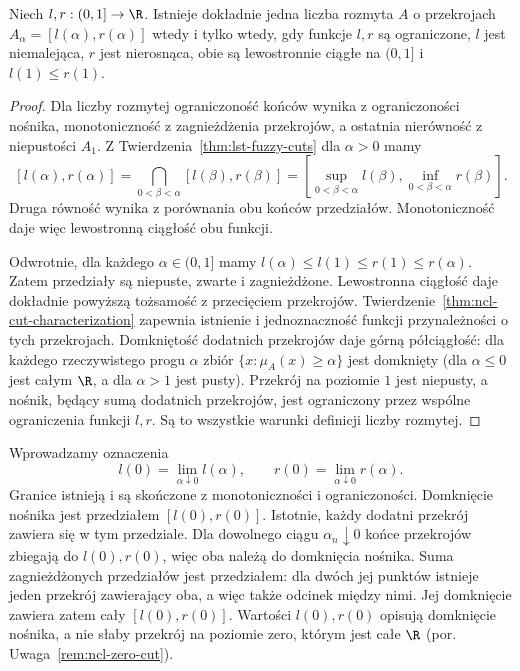 \begin{twierdzenie}
\label{thm:ncl-fuzzy-endpoints}
Niech $l,r:(0,1]\to\R$. Istnieje dokładnie jedna
liczba rozmyta $A$ o przekrojach
$A_\alpha=[l(\alpha),r(\alpha)]$ wtedy i tylko wtedy,
gdy funkcje $l,r$ są ograniczone, $l$ jest niemalejąca,
$r$ jest nierosnąca, obie są lewostronnie ciągłe
na $(0,1]$ i $l(1)\leq r(1)$.
\end{twierdzenie}
\begin{proof}
Dla liczby rozmytej ograniczoność końców wynika
z ograniczoności nośnika, monotoniczność z zagnieżdżenia
przekrojów, a ostatnia nierówność z niepustości $A_1$.
Z Twierdzenia~\ref{thm:lst-fuzzy-cuts} dla $\alpha>0$
mamy
\[
 [l(\alpha),r(\alpha)]
 =\bigcap_{0<\beta<\alpha}[l(\beta),r(\beta)]
 =\left[\sup_{0<\beta<\alpha}l(\beta),
         \inf_{0<\beta<\alpha}r(\beta)\right].
\]
Druga równość wynika z porównania obu końców
przedziałów. Monotoniczność daje więc lewostronną
ciągłość obu funkcji.

Odwrotnie, dla każdego $\alpha\in(0,1]$ mamy
$l(\alpha)\leq l(1)\leq r(1)\leq r(\alpha)$.
Zatem przedziały są niepuste, zwarte i zagnieżdżone.
Lewostronna ciągłość daje dokładnie powyższą
tożsamość z przecięciem przekrojów.
Twierdzenie~\ref{thm:ncl-cut-characterization}
zapewnia istnienie i jednoznaczność funkcji
przynależności o tych przekrojach.
Domkniętość dodatnich przekrojów daje górną
półciągłość: dla każdego rzeczywistego progu
$\alpha$ zbiór $\{x:\mu_A(x)\geq\alpha\}$ jest
domknięty (dla $\alpha\leq0$ jest całym $\R$,
a dla $\alpha>1$ jest pusty).
Przekrój na poziomie $1$ jest niepusty,
a nośnik, będący sumą dodatnich przekrojów,
jest ograniczony przez wspólne ograniczenia
funkcji $l,r$. Są to wszystkie warunki definicji
liczby rozmytej.
\end{proof}
Wprowadzamy oznaczenia
\[
 l(0)=\lim_{\alpha\downarrow0}l(\alpha),\qquad
 r(0)=\lim_{\alpha\downarrow0}r(\alpha).
\]
Granice istnieją i są skończone z monotoniczności
i ograniczoności. Domknięcie nośnika jest przedziałem
$[l(0),r(0)]$. Istotnie, każdy dodatni przekrój
zawiera się w tym przedziale. Dla dowolnego ciągu
$\alpha_n\downarrow0$ końce przekrojów zbiegają
do $l(0),r(0)$, więc oba należą do domknięcia nośnika.
Suma zagnieżdżonych przedziałów jest przedziałem:
dla dwóch jej punktów istnieje jeden przekrój
zawierający oba, a więc także odcinek między nimi.
Jej domknięcie zawiera zatem cały $[l(0),r(0)]$.
Wartości $l(0),r(0)$ opisują domknięcie nośnika,
a nie słaby przekrój na poziomie zero, którym
jest całe $\R$ (por. Uwaga~\ref{rem:ncl-zero-cut}).

